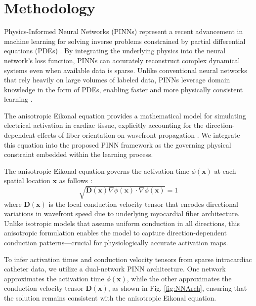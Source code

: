 \section{Methodology}

Physics-Informed Neural Networks (PINNs) represent a recent advancement in machine learning for solving inverse problems constrained by partial differential equations (PDEs) \cite{raissi2019,karniadakis2021physics}. By integrating the underlying physics into the neural network's loss function, PINNs can accurately reconstruct complex dynamical systems even when available data is sparse. Unlike conventional neural networks that rely heavily on large volumes of labeled data, PINNs leverage domain knowledge in the form of PDEs, enabling faster and more physically consistent learning \cite{cuomo2022scientific,mao2020physics}.

The anisotropic Eikonal equation provides a mathematical model for simulating electrical activation in cardiac tissue, explicitly accounting for the direction-dependent effects of fiber orientation on wavefront propagation \cite{ColliFranzone1990, Grandits2021Springer}. We integrate this equation into the proposed PINN framework as the governing physical constraint embedded within the learning process.

The anisotropic Eikonal equation governs the activation time $\phi(\mathbf{x})$ at each spatial location $\mathbf{x}$ as follows \cite{Grandits2021Springer}:
\begin{equation}
    \sqrt{ \mathbf{D}(\mathbf{x}) \nabla \phi(\mathbf{x}) \cdot \nabla  \phi(\mathbf{x})} = 1
\end{equation}
where $\mathbf{D}(\mathbf{x})$ is the local conduction velocity tensor that encodes directional variations in wavefront speed due to underlying myocardial fiber architecture. Unlike isotropic models that assume uniform conduction in all directions, this anisotropic formulation enables the model to capture direction-dependent conduction patterns—crucial for physiologically accurate activation maps.

To infer activation times and conduction velocity tensors from sparse intracardiac catheter data, we utilize a dual-network PINN architecture. One network approximates the activation time $\phi(\mathbf{x})$, while the other approximates the conduction velocity tensor $\mathbf{D}(\mathbf{x})$, as shown in Fig. \ref{fig:NNArch}, ensuring that the solution remains consistent with the anisotropic Eikonal equation.

